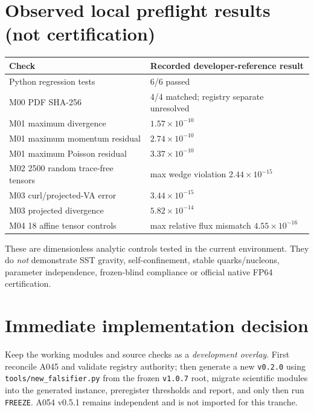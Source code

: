 \documentclass[10pt,a4paper]{article}
\newcommand{\code}[1]{\texttt{#1}}
\begin{document}
\section{Observed local preflight results (not certification)}
\begin{center}\small
\begin{tabular}{ll}
\toprule Check & Recorded developer-reference result\\\midrule
Python regression tests & 6/6 passed\\
M00 PDF SHA-256 & 4/4 matched; registry separate unresolved\\
M01 maximum divergence & $1.57\times10^{-10}$\\
M01 maximum momentum residual & $2.74\times10^{-10}$\\
M01 maximum Poisson residual & $3.37\times10^{-10}$\\
M02 2500 random trace-free tensors & max wedge violation $2.44\times10^{-15}$\\
M03 curl/projected-VA error & $3.44\times10^{-15}$\\
M03 projected divergence & $5.82\times10^{-14}$\\
M04 18 affine tensor controls & max relative flux mismatch $4.55\times10^{-16}$\\\bottomrule
\end{tabular}
\end{center}
These are dimensionless analytic controls tested in the current environment. They do \emph{not} demonstrate SST gravity, self-confinement, stable quarks/nucleons, parameter independence, frozen-blind compliance or official native FP64 certification.

\section{Immediate implementation decision}
Keep the working modules and source checks as a \emph{development overlay}. First reconcile A045 and validate registry authority; then generate a new \code{v0.2.0} using \code{tools/new\_falsifier.py} from the frozen \code{v1.0.7} root, migrate scientific modules into the generated instance, preregister thresholds and report, and only then run \code{FREEZE}. A054 v0.5.1 remains independent and is not imported for this tranche.


\end{document}
